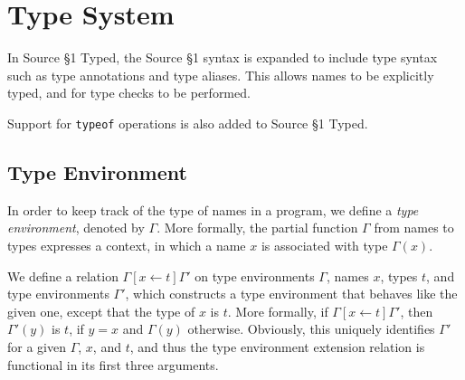 \newcommand{\Rule}[2]{\genfrac{}{}{0.7pt}{}{{\setlength{\fboxrule}{0pt}\setlength{\fboxsep}{3mm}\fbox{$#1$}}}{{\setlength{\fboxrule}{0pt}\setlength{\fboxsep}{3mm}\fbox{$#2$}}}}

\newcommand{\TruE}{\textbf{\texttt{true}}}
\newcommand{\FalsE}{\textbf{\texttt{false}}}
\newcommand{\AndOp}{\texttt{\&\&}}
\newcommand{\OrOp}{\texttt{||}}
\newcommand{\ThenOp}{\texttt{?}}
\newcommand{\ElseOp}{\texttt{:}}
\newcommand{\Rc}{\texttt{\}}}
\newcommand{\Lc}{\texttt{\{}}
\newcommand{\Rp}{\texttt{)}}
\newcommand{\Lp}{\texttt{(}}
\newcommand{\Fun}{\textbf{\texttt{function}}}
\newcommand{\Let}{\textbf{\texttt{let}}}
\newcommand{\Return}{\textbf{\texttt{return}}}
\newcommand{\Const}{\textbf{\texttt{const}}}
\newcommand{\If}{\textbf{\texttt{if}}}
\newcommand{\Else}{\textbf{\texttt{else}}}
\newcommand{\Bool}{\texttt{boolean}}
\newcommand{\Number}{\texttt{number}}
\newcommand{\String}{\texttt{string}}
\newcommand{\Undefined}{\texttt{undefined}}
\newcommand{\Any}{\texttt{any}}
\newcommand{\Void}{\texttt{void}}
\newcommand{\Pred}{\textit{Pred}}
\newcommand{\type}{\textit{type}}
\newcommand{\polytype}{\textit{polytype}}
\newcommand{\predtype}{\textit{predtype}}
\newcommand{\ExtractPos}{\ensuremath{\textit{Extract}^+}}
\newcommand{\ExtractNeg}{\ensuremath{\textit{Extract}^-}}

\newtheorem{definition}{Definition}[section]

\section{Type System}  

In Source \S 1 Typed, the Source \S 1 syntax is expanded to include type syntax such as type annotations and type aliases.
This allows names to be explicitly typed, and for type checks to be performed.

Support for \texttt{typeof} operations is also added to Source \S 1 Typed.

\subsection{Type Environment}

In order to keep track of the type of names in a program, we define a
\emph{type environment}, denoted by $\Gamma$. More formally,
the partial function $\Gamma$ from names to types expresses a 
context, in which a name $x$ is associated with type $\Gamma(x)$. 

We define a relation $\Gamma[x \leftarrow t]\Gamma'$ on type environments 
$\Gamma$, names $x$, types $t$, and type environments $\Gamma'$,
which constructs a type environment that behaves like the 
given one, except that the type of $x$ is $t$. More formally, 
if $\Gamma[x \leftarrow t]\Gamma'$, then $\Gamma'(y)$ is $t$, 
if $y=x$ and $\Gamma(y)$ 
otherwise. Obviously, this uniquely identifies $\Gamma'$ for
a given $\Gamma$, $x$, and $t$, and thus the type environment extension
relation is functional in its first three arguments.

